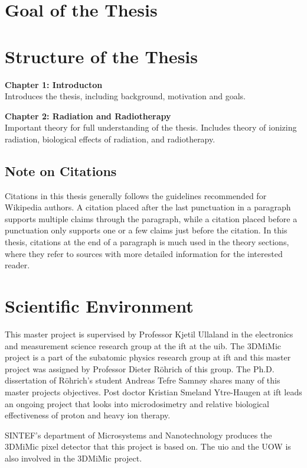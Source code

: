 \documentclass[../main/thesis.tex]{subfiles}
\begin{document}
\section{Goal of the Thesis}
\label{i-goal}




\section{Structure of the Thesis}
\label{i-structure}
\textbf{Chapter 1: Introducton}\\
Introduces the thesis, including background, motivation and goals.

\textbf{Chapter 2: Radiation and Radiotherapy}\\
Important theory for full understanding of the thesis. Includes theory of ionizing radiation, biological effects of radiation, and radiotherapy.

\subsection{Note on Citations}
Citations in this thesis generally follows the guidelines recommended for Wikipedia authors. A citation placed after the last punctuation in a paragraph supports multiple claims through the paragraph, while a citation placed before a punctuation only supports one or a few claims just before the citation. In this thesis, citations at the end of a paragraph is much used in the theory sections, where they refer to sources with more detailed information for the interested reader.

\section{Scientific Environment}
\label{i-environment}
This master project is supervised by Professor Kjetil Ullaland in the electronics and measurement science research group at the \gls{ift} at the \gls{uib}. The 3DMiMic project is a part of the subatomic physics research group at \gls{ift} and this master project was assigned by Professor Dieter Röhrich of this group. The Ph.D. dissertation of Röhrich's student Andreas Tefre Samnøy shares many of this master projects objectives. Post doctor Kristian Smeland Ytre-Haugen at \gls{ift} leads an ongoing project that looks into microdosimetry and relative biological effectiveness of proton and heavy ion therapy. 

SINTEF's department of Microsystems and Nanotechnology produces the 3DMiMic pixel detector that this project is based on. The \gls{uio} and the \gls{UOW} is also involved in the 3DMiMic project. 

\end{document}
